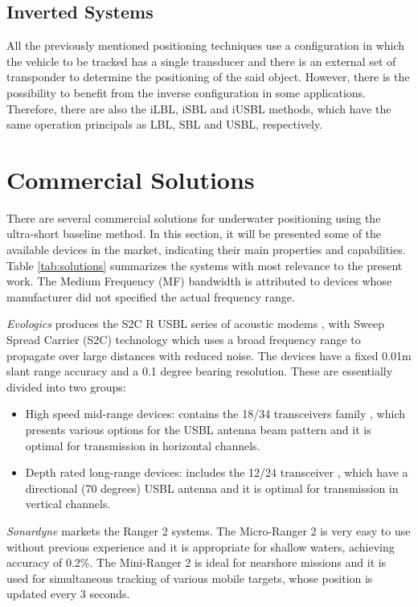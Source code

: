 \subsection{Inverted Systems}

All the previously mentioned positioning techniques use a configuration in which the vehicle to be tracked has a single transducer and there is an external set of transponder to determine the positioning of the said object. However, there is the possibility to benefit from the inverse configuration in some applications. Therefore, there are also the iLBL, iSBL and iUSBL methods, which have the same operation principals as LBL, SBL and USBL, respectively.


\section{Commercial Solutions}

There are several commercial solutions for underwater positioning using the ultra-short baseline method. In this section, it will be presented some of the available devices in the market, indicating their main properties and capabilities. Table \ref{tab:solutions} summarizes the systems with most relevance to the present work. The Medium Frequency (MF) bandwidth is attributed to devices whose manufacturer did not specified the actual frequency range.

\textit{Evologics} produces the S2C R USBL series of acoustic modems \cite{evologics1}, with Sweep Spread Carrier (S2C) technology \cite{evologics2} which uses a broad frequency range to propagate over large distances with reduced noise. The devices have a fixed 0.01m slant range accuracy and a 0.1 degree bearing resolution. These are essentially divided into two groups:
\begin{itemize}
	\item High speed mid-range devices: contains the 18/34 transceivers family \cite{evologics3}, which presents various options for the USBL antenna beam pattern and it is optimal for transmission in horizontal channels.
	\item Depth rated long-range devices: includes the 12/24 transceiver \cite{evologics4}, which have a directional (70 degrees) USBL antenna  and it is optimal for transmission in vertical channels.
\end{itemize}

\textit{Sonardyne} markets the Ranger 2 systems. The Micro-Ranger 2 \cite{sonardyne1} is very easy to use without previous experience and it is appropriate for shallow waters, achieving accuracy of 0.2\%. The Mini-Ranger 2 is ideal for nearshore missions and it is  used for simultaneous tracking of various mobile targets, whose position is updated every 3 seconds.

